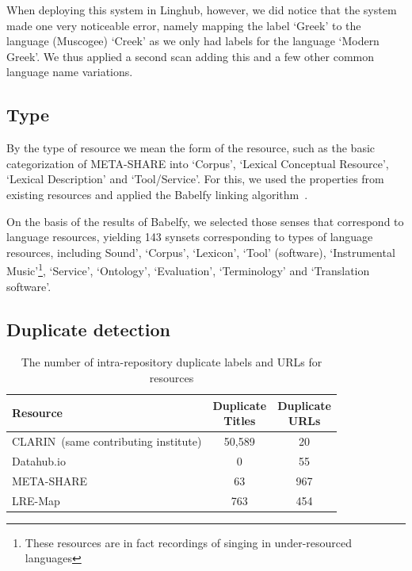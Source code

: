 \documentclass[smallextended]{svjour3}       %
\begin{document}
When deploying this system in Linghub, however, we did notice that the
system made one very noticeable error, namely mapping the label `Greek' to the
language (Muscogee) `Creek' as we only had labels for the language `Modern
Greek'. We thus applied a second scan adding this and a few other common
language name variations.

\subsection{Type}

By the type of resource we mean the form of the resource, such as the basic
categorization of META-SHARE into `Corpus', `Lexical Conceptual Resource', 
`Lexical Description' and `Tool/Service'. For this, we used the properties from
existing resources and applied the Babelfy linking
algorithm~\cite{Moroetal:14tacl}. 

On the basis of the results of Babelfy, we selected those senses that correspond
to language resources, yielding 143 synsets corresponding to types of language
resources, including Sound', `Corpus', `Lexicon', `Tool' (software),
`Instrumental Music'\footnote{These resources are in fact recordings of singing
in under-resourced languages}, `Service', `Ontology', `Evaluation',
`Terminology' and `Translation software'. 

\subsection{Duplicate detection}

\begin{table}
    \begin{center}
    \begin{tabular}{lcc}
        \toprule
        Resource   & \thead{Duplicate \\ Titles} & \thead{Duplicate \\ URLs} \\
        \midrule                                                            
        CLARIN{\tiny~(same contributing institute)}     & 50,589           & 20          \\   
        Datahub.io & 0                & 55             \\
        META-SHARE & 63               & 967            \\
        LRE-Map    & 763              & 454            \\
        \bottomrule
    \end{tabular}
    \end{center}
    \caption{\label{tab:self-dupes}The number of intra-repository duplicate labels and URLs for
    resources}
\end{table}
\end{document}

